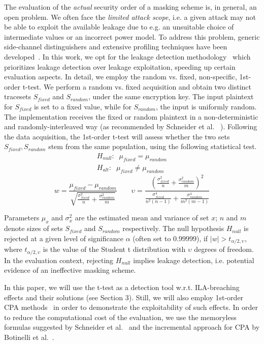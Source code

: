 The evaluation of the \emph{actual} security order of a masking scheme is, in general, an open problem. We often face the \emph{limited attack scope}, i.e. a given attack may not be able to exploit the available leakage due to e.g. an unsuitable choice of intermediate values or an incorrect power model. To address this problem, generic side-channel distinguishers and extensive profiling techniques have been developed~\cite{DBLP:journals/joc/BatinaGPRSV11,DBLP:conf/cardis/WhitnallOM11,DBLP:conf/eurocrypt/StandaertMY09}. In this work, we opt for the
leakage detection methodology~\cite{tvla} which prioritizes leakage detection over leakage exploitation, speeding up certain evaluation aspects. In detail, we employ the random vs. fixed, non-specific, 1st-order t-test. We perform a random vs. fixed acquisition and obtain two distinct tracesets $S_{fixed}$ and $S_{random}$, under the same encryption key. The input plaintext for $S_{fixed}$ is set to a fixed value, while for $S_{random}$, the input is uniformly random. The implementation receives the fixed or random plaintext in a non-deterministic and randomly-interleaved way (as recommended by Schneider et al. ~\cite{DBLP:conf/ches/SchneiderM15}). Following the data acquisition, the 1st-order t-test will assess whether the two sets $S_{fixed},S_{random}$ stem from the same population, using the following statistical test.
\begin{equation}
\begin{split}
H_{null}: \;\; \mu_{fixed} = \mu_{random} \\
H_{alt}: \;\; \mu_{fixed} \neq \mu_{random}
\end{split}
\end{equation}
\begin{equation}
w = \frac {\mu_{fixed} - \mu_{random}} {\sqrt{ \frac{\sigma_{fixed}^2}{n} + \frac{\sigma_{random}^2}   {m}  }  } \qquad \upsilon = \frac { (\frac{\sigma_{fixed}^2} {n}   + \frac{\sigma_{random}^2} {m}) ^2  } {\frac{\sigma_{fixed}^4} {n^2(n-1)} + \frac{\sigma_{random}^4} {m^2(m-1)}  }
\end{equation}


Parameters $\mu_{x}$ and $\sigma_{x}^2$ are the estimated mean and variance of set $x$; 
$n$ and $m$ denote sizes of sets $S_{fixed}$ and $S_{random}$ respectively. The null hypothesis $H_{null}$ is rejected at a given level of significance $\alpha$ (often set to $0.99999$), if $\lvert w \lvert >  t_{\alpha/2,\upsilon}  $, where $t_{\alpha/2,\upsilon}$ is the value of the Student t distribution with $\upsilon$ degrees of freedom. In the evaluation context, rejecting $H_{null}$ implies leakage detection, i.e. potential evidence of an ineffective masking scheme.

In this paper, we will use the t-test as a detection tool w.r.t. ILA-breaching effects and their solutions (see Section 3). Still, we will also employ 1st-order CPA methods~\cite{DBLP:conf/ches/BrierCO04} in order to demonstrate the exploitability of such effects. In order to reduce the computational cost of the evaluation, we use the memoryless formulas suggested by Schneider et al.~\cite{DBLP:conf/ches/SchneiderM15} and the incremental approach for CPA by Botinelli et al.~\cite{DBLP:journals/iacr/BottinelliB15}.


